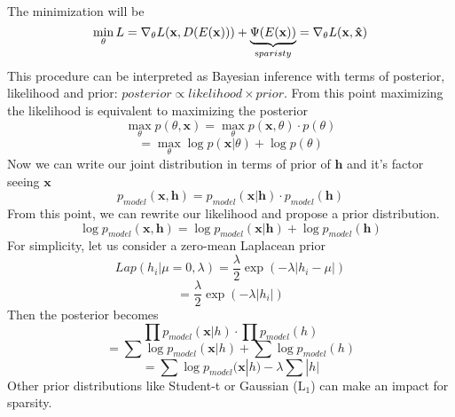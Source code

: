 \documentclass[11pt,twocolumn]{article}
\begin{document}
\\
The minimization will be
$$\min\limits_{\theta} L = \nabla_\theta L(\mathbf{x}, D(E(\mathbf{x}))) + \underbrace{\Psi(E(\mathbf{x}))}_{\text sparisty} =\nabla_\theta L(\mathbf{x}, \mathbf{\hat{x}}) $$
This procedure can be interpreted as Bayesian inference with terms of posterior, likelihood and prior: $posterior \propto likelihood \times prior$. From this point maximizing the likelihood is equivalent to maximizing the posterior
$$\max\limits_{\theta} p(\theta,\mathbf{x})=\max\limits_{\theta} p(\mathbf{x},\theta) \cdot p(\theta)$$
$$=\max\limits_{\theta}\log p(\mathbf{x} | \theta) + \log p(\theta)$$ 
Now we can write our joint distribution in terms of prior of $\mathbf{h}$ and it's factor seeing  $\mathbf{x}$ 
$$p_{model}(\mathbf{x},\mathbf{h}) = p_{model}(\mathbf{x}|\mathbf{h}) \cdot p_{model}(\mathbf{h})$$
From this point, we can rewrite our likelihood and propose a prior distribution. 
$$\log p_{model}(\mathbf{x},\mathbf{h}) = \log p_{model}(\mathbf{x}|\mathbf{h}) + \log p_{model}(\mathbf{h})$$
For simplicity, let us consider a zero-mean Laplacean prior
$$ Lap(h_i|\mu=0,\lambda) = \frac{\lambda}{2}\exp(-\lambda|h_i - \mu|)$$
$$ = \frac{\lambda}{2}\exp(-\lambda|h_i |)$$
Then the posterior becomes
$$\prod p_{model}(\mathbf{x}|h) \cdot \prod  p_{model}(h)$$
$$= \sum \log p_{model}(\mathbf{x}|h) + \sum \log  p_{model}(h)$$
$$ = \sum \log p_{model}(\mathbf{x}|h) - \lambda \sum |h|$$  
Other prior distributions like Student-t or Gaussian ($\text{L}_1$)  can make an impact for sparsity.
\end{document}
